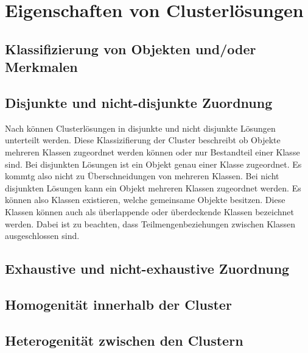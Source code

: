 \chapter{Eigenschaften von Clusterlösungen}

\section{Klassifizierung von Objekten und/oder Merkmalen}
\section{Disjunkte und nicht-disjunkte Zuordnung}
Nach \cite{Bankhofer.2008} können Clusterlösungen in disjunkte und nicht disjunkte Lösungen unterteilt werden. Diese Klassizifierung der Cluster beschreibt ob Objekte mehreren Klassen zugeordnet werden können oder nur Bestandteil einer Klasse sind. 
Bei disjunkten Lösungen ist ein Objekt genau einer Klasse zugeordnet. Es kommtg also nicht zu Überschneidungen von mehreren Klassen.
Bei nicht disjunkten Lösungen kann ein Objekt mehreren Klassen zugeordnet werden. Es können also Klassen existieren, welche gemeinsame Objekte besitzen. Diese Klassen können auch als überlappende oder überdeckende Klassen bezeichnet werden. Dabei ist zu beachten, dass Teilmengenbeziehungen zwischen Klassen ausgeschlossen sind.
\section{Exhaustive und nicht-exhaustive Zuordnung}
\section{Homogenität innerhalb der Cluster}
\section{Heterogenität zwischen den Clustern}
